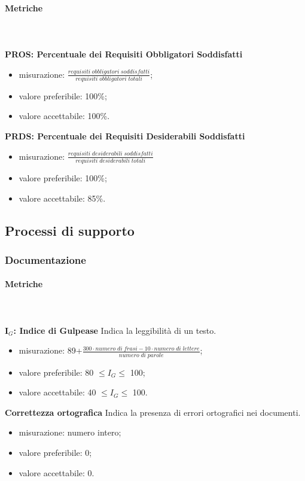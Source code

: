 			\paragraph{Metriche} \mbox{} \\ \\
				\textbf{PROS: Percentuale dei Requisiti Obbligatori Soddisfatti} 
				\begin{itemize}
					\item misurazione: $\frac{requisiti \; obbligatori \; soddisfatti}{requisiti \; obbligatori \; totali}$;
					\item valore preferibile: 100\%;
					\item valore accettabile: 100\%.
				\end{itemize}
				\textbf{PRDS: Percentuale dei Requisiti Desiderabili Soddisfatti} 
				\begin{itemize}
					\item misurazione: $\frac{requisiti \; desiderabili \; soddisfatti}{requisiti \; desiderabili \; totali}$
					\item valore preferibile: 100\%;
					\item valore accettabile: 85\%.
				\end{itemize}
			
	\subsection{Processi di supporto}		
		\subsubsection{Documentazione}
			\paragraph{Metriche} \mbox{} \\ \\
			\textbf{I$_{G}$: Indice di Gulpease} Indica la leggibilità di un testo.
			\begin{itemize}
				\item misurazione: 89+$\frac{300\cdot numero \; di \; frasi-10\cdot numero \; di \; lettere}{numero \; di \; parole}$;
				\item valore preferibile: 80 $\le I_{G} \le$ 100;
				\item valore accettabile: 40 $\le I_{G} \le$ 100.
			\end{itemize}
			\textbf{Correttezza ortografica} Indica la presenza di errori ortografici nei documenti.
			\begin{itemize}
				\item misurazione: numero intero;
				\item valore preferibile: 0;
				\item valore accettabile: 0.
			\end{itemize}
				
